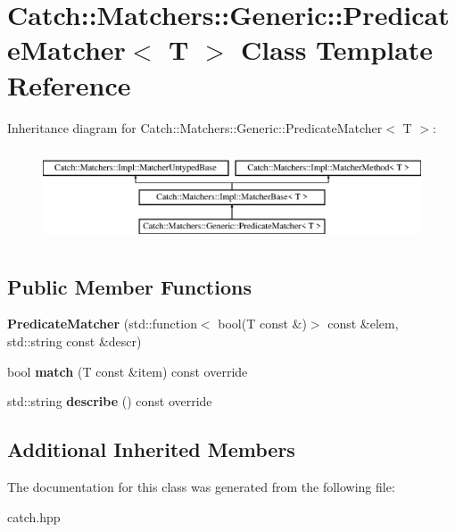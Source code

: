 \hypertarget{classCatch_1_1Matchers_1_1Generic_1_1PredicateMatcher}{}\section{Catch\+::Matchers\+::Generic\+::Predicate\+Matcher$<$ T $>$ Class Template Reference}
\label{classCatch_1_1Matchers_1_1Generic_1_1PredicateMatcher}
Inheritance diagram for Catch\+::Matchers\+::Generic\+::Predicate\+Matcher$<$ T $>$\+:\begin{figure}[H]
\begin{center}
\leavevmode
\includegraphics[height=2.790698cm]{classCatch_1_1Matchers_1_1Generic_1_1PredicateMatcher}
\end{center}
\end{figure}
\subsection*{Public Member Functions}
\begin{DoxyCompactItemize}
\item 
\mbox{\label{classCatch_1_1Matchers_1_1Generic_1_1PredicateMatcher_a57d53ef028c2f7b92b016f627f91aa76}} 
{\bfseries Predicate\+Matcher} (std\+::function$<$ bool(T const \&)$>$ const \&elem, std\+::string const \&descr)
\item 
\mbox{\label{classCatch_1_1Matchers_1_1Generic_1_1PredicateMatcher_a2ec0e8ec19c4c5e26271d59a06a62b52}} 
bool {\bfseries match} (T const \&item) const override
\item 
\mbox{\label{classCatch_1_1Matchers_1_1Generic_1_1PredicateMatcher_af7d59e94892cc09471bbaefac4c889fd}} 
std\+::string {\bfseries describe} () const override
\end{DoxyCompactItemize}
\subsection*{Additional Inherited Members}


The documentation for this class was generated from the following file\+:\begin{DoxyCompactItemize}
\item 
catch.\+hpp\end{DoxyCompactItemize}
